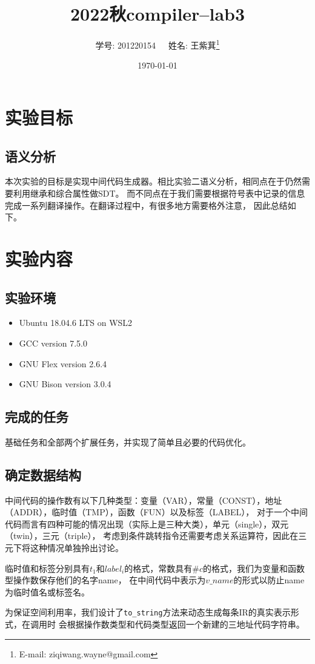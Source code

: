 \documentclass[twocolumn]{article}
\title{2022秋compiler--lab3}
\author{学号: 201220154\ \ \ 姓名: 王紫萁\thanks{E-mail: ziqiwang.wayne@gmail.com}}
\date{\today}
\affil{Department of Computer Science, Nanjing University}
\begin{document}
\maketitle
\section{实验目标}
\subsection{语义分析}
本次实验的目标是实现中间代码生成器。相比实验二语义分析，相同点在于仍然需要利用继承和综合属性做SDT。
而不同点在于我们需要根据符号表中记录的信息完成一系列翻译操作。在翻译过程中，有很多地方需要格外注意，
因此总结如下。
\section{实验内容}
\subsection{实验环境}
\begin{itemize}
    \item Ubuntu 18.04.6 LTS on WSL2
    \item GCC version 7.5.0
    \item GNU Flex version 2.6.4
    \item GNU Bison version 3.0.4
\end{itemize}
\subsection{完成的任务}
基础任务和全部两个扩展任务，并实现了简单且必要的代码优化。
\subsection{确定数据结构}
中间代码的操作数有以下几种类型：变量（VAR），常量（CONST），地址（ADDR），临时值（TMP），函数（FUN）以及标签（LABEL），
对于一个中间代码而言有四种可能的情况出现（实际上是三种大类），单元（single），双元（twin），三元（triple），
考虑到条件跳转指令还需要考虑关系运算符，因此在三元下将这种情况单独拎出讨论。

临时值和标签分别具有$t_1$和$label_i$的格式，常数具有$\#c$的格式，我们为变量和函数型操作数保存他们的名字name，
在中间代码中表示为$v\_name$的形式以防止name为临时值名或标签名。

为保证空间利用率，我们设计了\verb|to_string|方法来动态生成每条IR的真实表示形式，在调用时
会根据操作数类型和代码类型返回一个新建的三地址代码字符串。
\end{document}
